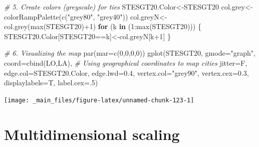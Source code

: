 \documentclass[
  notitlepage,
  onecolumn,
  openany]{book}
\newenvironment{Shaded}{\begin{snugshade}}{\end{snugshade}}
\newcommand{\AttributeTok}[1]{\textcolor[rgb]{0.77,0.63,0.00}{#1}}
\newcommand{\CommentTok}[1]{\textcolor[rgb]{0.56,0.35,0.01}{\textit{#1}}}
\newcommand{\ControlFlowTok}[1]{\textcolor[rgb]{0.13,0.29,0.53}{\textbf{#1}}}
\newcommand{\DecValTok}[1]{\textcolor[rgb]{0.00,0.00,0.81}{#1}}
\newcommand{\FloatTok}[1]{\textcolor[rgb]{0.00,0.00,0.81}{#1}}
\newcommand{\FunctionTok}[1]{\textcolor[rgb]{0.00,0.00,0.00}{#1}}
\newcommand{\NormalTok}[1]{#1}
\newcommand{\OtherTok}[1]{\textcolor[rgb]{0.56,0.35,0.01}{#1}}
\newcommand{\SpecialCharTok}[1]{\textcolor[rgb]{0.00,0.00,0.00}{#1}}
\newcommand{\StringTok}[1]{\textcolor[rgb]{0.31,0.60,0.02}{#1}}
\begin{document}
\begin{Shaded}
\begin{Highlighting}[]
\CommentTok{\# 5. Create colors (greyscale) for ties}
\NormalTok{STESGT20.Color}\OtherTok{\textless{}{-}}\NormalTok{STESGT20}
\NormalTok{col.grey}\OtherTok{\textless{}{-}}\FunctionTok{colorRampPalette}\NormalTok{(}\FunctionTok{c}\NormalTok{(}\StringTok{"grey80"}\NormalTok{, }\StringTok{"grey40"}\NormalTok{))}
\NormalTok{col.greyN}\OtherTok{\textless{}{-}}\FunctionTok{col.grey}\NormalTok{(}\FunctionTok{max}\NormalTok{(STESGT20)}\SpecialCharTok{+}\DecValTok{1}\NormalTok{)}
\ControlFlowTok{for}\NormalTok{ (k }\ControlFlowTok{in}\NormalTok{ (}\DecValTok{1}\SpecialCharTok{:}\FunctionTok{max}\NormalTok{(STESGT20)))}
\NormalTok{\{}
\NormalTok{    STESGT20.Color[STESGT20}\SpecialCharTok{==}\NormalTok{k]}\OtherTok{\textless{}{-}}\NormalTok{col.greyN[k}\SpecialCharTok{+}\DecValTok{1}\NormalTok{]}
\NormalTok{\}}
\end{Highlighting}
\end{Shaded}

\begin{Shaded}
\begin{Highlighting}[]
\CommentTok{\# 6. Visualizing the map}
\FunctionTok{par}\NormalTok{(}\AttributeTok{mar=}\FunctionTok{c}\NormalTok{(}\DecValTok{0}\NormalTok{,}\DecValTok{0}\NormalTok{,}\DecValTok{0}\NormalTok{,}\DecValTok{0}\NormalTok{))}
\FunctionTok{gplot}\NormalTok{(STESGT20, }
      \AttributeTok{gmode=}\StringTok{"graph"}\NormalTok{,}
      \AttributeTok{coord=}\FunctionTok{cbind}\NormalTok{(LO,LA), }\CommentTok{\# Using geographical coordinates to map cities}
      \AttributeTok{jitter=}\NormalTok{F,}
      \AttributeTok{edge.col=}\NormalTok{STESGT20.Color,}
      \AttributeTok{edge.lwd=}\FloatTok{0.4}\NormalTok{,}
      \AttributeTok{vertex.col=}\StringTok{"grey90"}\NormalTok{,}
      \AttributeTok{vertex.cex=}\FloatTok{0.3}\NormalTok{,}
      \AttributeTok{displaylabels=}\NormalTok{T, }
      \AttributeTok{label.cex=}\NormalTok{.}\DecValTok{5}\NormalTok{)}
\end{Highlighting}
\end{Shaded}

\begin{center}\texttt{[image: \_main\_files/figure-latex/unnamed-chunk-123-1]} \end{center}

\hypertarget{multidimensional-scaling}{%
\section{Multidimensional scaling}\label{multidimensional-scaling}}
\end{document}
